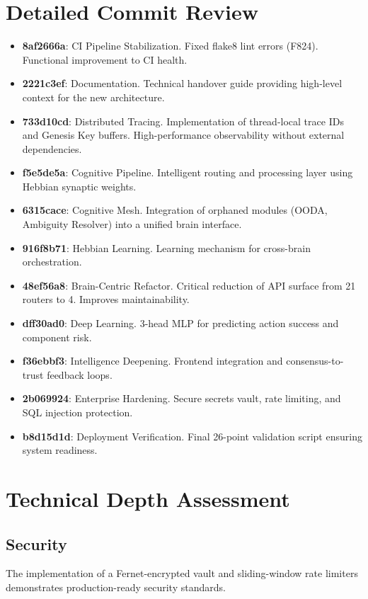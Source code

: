 \documentclass{article}
\begin{document}
\section{Detailed Commit Review}
\begin{itemize}
    \item \textbf{8af2666a}: CI Pipeline Stabilization. Fixed flake8 lint errors (F824). Functional improvement to CI health.
    \item \textbf{2221c3ef}: Documentation. Technical handover guide providing high-level context for the new architecture.
    \item \textbf{733d10cd}: Distributed Tracing. Implementation of thread-local trace IDs and Genesis Key buffers. High-performance observability without external dependencies.
    \item \textbf{f5e5de5a}: Cognitive Pipeline. Intelligent routing and processing layer using Hebbian synaptic weights. 
    \item \textbf{6315cace}: Cognitive Mesh. Integration of orphaned modules (OODA, Ambiguity Resolver) into a unified brain interface.
    \item \textbf{916f8b71}: Hebbian Learning. Learning mechanism for cross-brain orchestration.
    \item \textbf{48ef56a8}: Brain-Centric Refactor. Critical reduction of API surface from 21 routers to 4. Improves maintainability.
    \item \textbf{dff30ad0}: Deep Learning. 3-head MLP for predicting action success and component risk.
    \item \textbf{f36ebbf3}: Intelligence Deepening. Frontend integration and consensus-to-trust feedback loops.
    \item \textbf{2b069924}: Enterprise Hardening. Secure secrets vault, rate limiting, and SQL injection protection.
    \item \textbf{b8d15d1d}: Deployment Verification. Final 26-point validation script ensuring system readiness.
\end{itemize}

\section{Technical Depth Assessment}
\subsection{Security}
The implementation of a Fernet-encrypted vault and sliding-window rate limiters demonstrates production-ready security standards.
\end{document}

